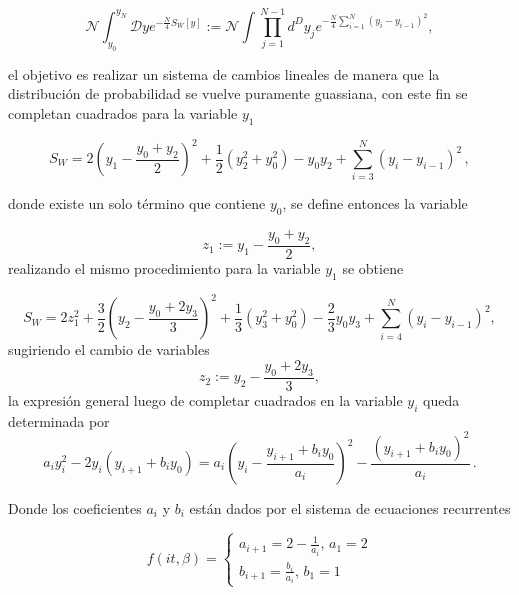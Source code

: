 \begin{equation}
\mathcal{N} \int _{y_0} ^{y_N} \mathcal{D} y 
e^{-\frac{N}{4} S _{W} [y]} :=
\mathcal{N} \int \prod _{j=1} ^{N-1} d ^{D} y _{j} e^{- \frac{N}{4} \sum _{i=1} ^{N} ( y _i - y _{i-1} )^2 } ,
\label{eq.definicion_accion_discreta}
\end{equation}

el objetivo es realizar un sistema de cambios lineales de manera que la distribución de probabilidad se vuelve puramente guassiana, con este fin se completan cuadrados para la variable $ y_1$


\begin{equation}
S _{W} = 	2 \left( y _1 - \frac{y_0 + y_2}{2} \right) ^2 + 
			\frac{1}{2} \left( y ^2 _2 + y _0 ^2 \right)   -
			y _0 y_2 +
			\sum _{i = 3} ^{N} (y _i - y _{i-1}) ^2 
\, ,
\end{equation}

donde existe un solo término que contiene $y_0$, se define entonces la variable

\begin{equation}
z _1 := y_1 - \frac{y _0  + y_2 }{2} ,
\end{equation}
realizando el mismo procedimiento para la variable $y_1$ se obtiene


\begin{equation}
S _W = 2 z_1 ^2 +
		\frac{3}{2} \left( y _2 - \frac{y _0 + 2 y_3}{3} \right) ^2 +
		\frac{1}{3} \left( y _3 ^2 + y _0 ^2 \right) -
		\frac{2}{3} y_0 y_3 +
		\sum _{i = 4} ^{N} (y _i - y _{i-1}) ^2 
		,
\end{equation}
sugiriendo el cambio de variables
\begin{equation}
z _2 := y_2 - \frac{y _0  + 2 y_3 }{3} ,
\end{equation}
la expresión general luego de completar cuadrados en la variable $y_i$ queda determinada por 
\begin{equation}
a _i y _i ^2 - 2 y_i ( y _{i+1} + b _i y_0 ) =
a _i \left( y _i - \frac{y _{i+1} + b_i y_0}{a_i} \right) ^2 -
\frac{\left( y _{i+1} + b_i y_0 \right) ^2}{a _i}
\, .
\end{equation}


Donde los coeficientes $a_i$ y $b_i$ están dados por el sistema de ecuaciones recurrentes

\[ 
f   ( i t ,\beta )=
\begin{cases} 
	  a_{i+1} = 2 - \frac{1}{a_i},  \, a _1 = 2
\\
	  	  b_{i+1} = \frac{b _i}{a _i},  \, b _1 = 1
   \end{cases}   
\] 

